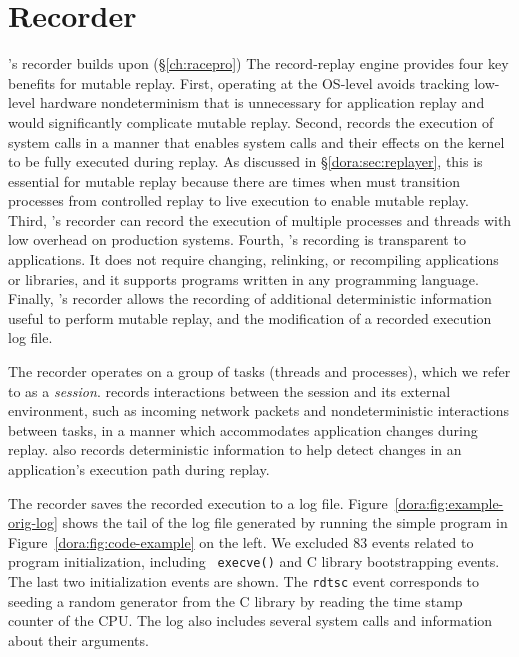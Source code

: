 \section{Recorder}
\label{dora:sec:recorder}

{\dora}'s recorder builds upon \racepro (\S\ref{ch:racepro})
The \racepro record-replay engine provides four key benefits for mutable replay. First, operating
at the OS-level avoids tracking low-level hardware nondeterminism that
is unnecessary for application replay and would significantly
complicate mutable replay.  Second, {\dora} records the execution
of system calls in a manner that enables system calls and their effects
on the kernel to be fully executed during replay.  As discussed in
\S\ref{dora:sec:replayer}, this is essential for mutable replay
because there are times when {\dora} must transition processes
from controlled replay to live execution to enable mutable replay.
Third, {\dora}'s recorder can record the execution of multiple
processes and threads with low overhead on production systems. Fourth,
{\dora}'s recording is transparent to applications.  It does not
require changing, relinking, or recompiling applications or libraries,
and it supports programs written in any programming language.
Finally, \racepro's recorder allows the recording of additional deterministic
information useful to perform mutable replay, and the modification of a recorded
execution log file.

The recorder operates on a group of tasks (threads and processes), which we
refer to as a {\em session}. {\dora} records interactions between the
session and its external environment, such as incoming network packets and
nondeterministic interactions between tasks, in a manner which accommodates
application changes during replay. {\dora} also records deterministic
information to help detect changes in an application's execution path during
replay.

The recorder saves the recorded execution to a log file.
Figure~\ref{dora:fig:example-orig-log} shows the
tail of the log file generated by running the simple program in
Figure~\ref{dora:fig:code-example} on the left.
We excluded 83 events related to program initialization, including {\tt
execve()} and C library bootstrapping events. The last two initialization events
are shown. The {\tt rdtsc} event corresponds to seeding a random generator from the C library
by reading the time stamp counter of the CPU. The log also includes
several system calls and information about their arguments.

